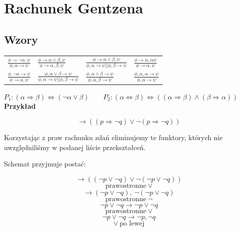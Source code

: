 \section{Rachunek Gentzena}

\subsection{Wzory}

\begin{tabularx}{\textwidth}{X X X X}
    \centering
    $ \displaystyle\frac{\phi \rightarrow \neg \alpha ,\psi }{\phi, \alpha \rightarrow \psi} $ & 
    $ \displaystyle\frac{\phi \rightarrow \alpha \lor \beta, \psi }{\phi \rightarrow \alpha, \beta, \psi} $ &
    $ \displaystyle\frac{\phi \rightarrow \alpha \land \beta, \psi }{\phi, \alpha \rightarrow \psi || \phi, \beta \rightarrow \psi} $ &
    $ \displaystyle\frac{\phi \rightarrow \alpha, \alpha \psi}{\phi \rightarrow \alpha, \psi} $ \\[20pt]

    \centering
    $ \displaystyle\frac{\phi, \neg \alpha \rightarrow \psi}{\phi \rightarrow \alpha, \psi} $ &
    $ \displaystyle\frac{\phi, \alpha \lor \beta \rightarrow \psi}{\phi, \alpha \rightarrow \psi || \phi, \beta \rightarrow \psi} $ &
    $ \displaystyle\frac{\phi, \alpha \land \beta \rightarrow \psi}{\phi, \alpha, \beta \rightarrow \psi} $ & 
    $ \displaystyle\frac{\phi, \alpha, \alpha \rightarrow \psi}{\phi, \alpha \rightarrow \psi} $ \\[20pt]
\end{tabularx}

$ P_1 : (\alpha \Rightarrow \beta) \Leftrightarrow (\neg \alpha \lor \beta) \quad \quad 
P_2 : (\alpha \Leftrightarrow \beta) \Leftrightarrow ((\alpha \Rightarrow \beta) \land (\beta \Rightarrow \alpha)) $ \\

\textbf{Przykład}

$$ \rightarrow ((p \Rightarrow \neg q) \lor \neg(p \Rightarrow \neg q)) $$

Korzystając z praw rachunku zdań eliminujemy te funktory, których nie uwzględniliśmy w podanej liście przekształceń.

\pagebreak Schemat przyjmuje postać:

$$ \rightarrow ((\neg p \lor \neg q) \lor \neg(\neg p \lor \neg q)) $$
$$ \textrm{prawostronne} \ \lor $$
$$ \rightarrow (\neg p \lor \neg q), \ \neg(\neg p \lor \neg q) $$
$$ \textrm{prawostronne} \ \neg $$
$$ \neg p \lor \neg q \rightarrow \neg p \lor \neg q $$
$$ \textrm{prawostronne} \ \lor $$
$$ \neg p \lor \neg q \rightarrow \neg p, \neg q $$
$$ \lor \ \textrm{po lewej} $$

